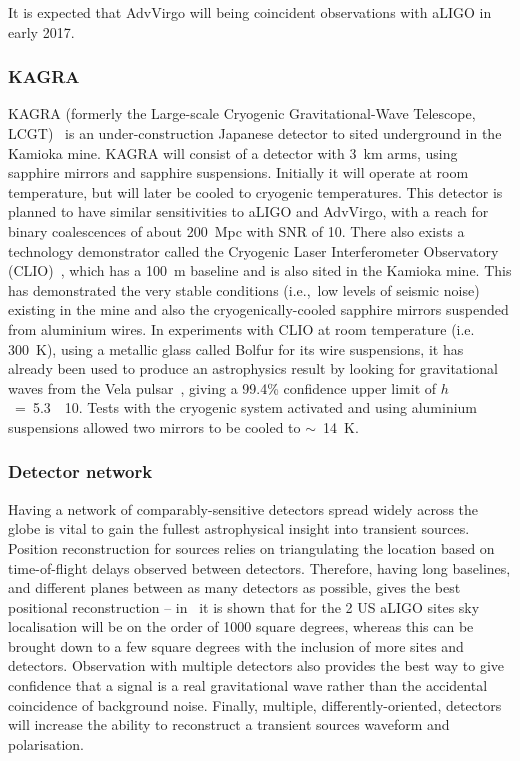 It is expected that AdvVirgo will being coincident observations with aLIGO in early 2017.

\subsubsection{KAGRA}

KAGRA (formerly the Large-scale Cryogenic Gravitational-Wave Telescope,
LCGT)~\cite{2013PhRvD..88d3007A, Miyoki:2005, Ohashi:2008, Kuroda:2010} is an under-construction Japanese detector to
sited underground in the Kamioka mine. KAGRA will consist of a detector with 3~km arms, using
sapphire mirrors and sapphire suspensions. Initially it will operate at room temperature,
but will later be cooled to cryogenic
temperatures. This detector is planned to have similar sensitivities
to aLIGO and AdvVirgo, with a reach for binary coalescences of about 200~Mpc
with SNR of 10. There also exists a technology demonstrator called the
Cryogenic Laser Interferometer Observatory (CLIO)~\cite{Yamamoto:2008, CLIOweb},
which has a 100~m baseline and is also sited in the Kamioka mine. This has
demonstrated the very stable conditions (i.e.,\ low levels of seismic noise)
existing in the mine and also the cryogenically-cooled sapphire mirrors
suspended from aluminium wires. In experiments with CLIO at room temperature
(i.e.\, 300~K), using a metallic glass called Bolfur for its wire suspensions, it
has already been used to produce an astrophysics result by looking for
gravitational waves from the Vela pulsar~\cite{Akutsu:2008}, giving a 99.4\%
confidence upper limit of $h$~=~5.3~\texttimes~10. Tests with the cryogenic
system activated and using aluminium suspensions allowed two mirrors to be
cooled to $\sim$~14~K.

\subsubsection{Detector network}

Having a network of comparably-sensitive detectors spread widely across the
globe is vital to gain the fullest astrophysical insight into transient sources.
Position reconstruction for sources relies on triangulating the location based
on time-of-flight delays observed between detectors. Therefore, having long
baselines, and different planes between as many detectors as possible, gives the
best positional reconstruction -- in~\cite{Fairhurst:2010} it is shown that for
the 2 US aLIGO sites sky localisation will be on the order of 1000 square degrees,
whereas this can be brought down to a few square degrees with the inclusion of
more sites and detectors. Observation with multiple detectors also provides the
best way to give confidence that a signal is a real gravitational wave rather
than the accidental coincidence of background noise. Finally, multiple,
differently-oriented, detectors will increase the ability to reconstruct a
transient sources waveform and polarisation.

